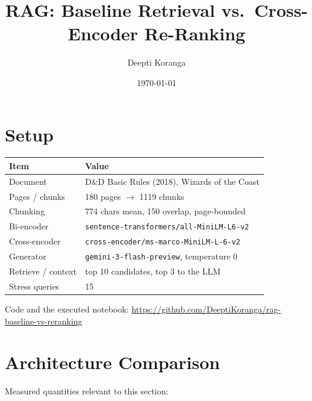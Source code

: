\documentclass[11pt,a4paper]{article}
\title{\textbf{RAG: Baseline Retrieval vs.\ Cross-Encoder Re-Ranking}}
\author{Deepti Koranga}
\date{\today}
\begin{document}
\maketitle

\section*{Setup}
\begin{center}\begin{tabular}{ll}\toprule
\textbf{Item} & \textbf{Value} \\ \midrule
Document & D\&D Basic Rules (2018), Wizards of the Coast \\
Pages / chunks & 180 pages $\rightarrow$ 1119 chunks \\
Chunking & 774 chars mean, 150 overlap, page-bounded \\
Bi-encoder & \texttt{sentence-transformers/all-MiniLM-L6-v2} \\
Cross-encoder & \texttt{cross-encoder/ms-marco-MiniLM-L-6-v2} \\
Generator & \texttt{gemini-3-flash-preview}, temperature 0 \\
Retrieve / context & top 10 candidates, top 3 to the LLM \\
Stress queries & 15 \\
\bottomrule\end{tabular}\end{center}

Code and the executed notebook:
\url{https://github.com/DeeptiKoranga/rag-baseline-vs-reranking}

\section{Architecture Comparison}

Measured quantities relevant to this section:
\end{document}
